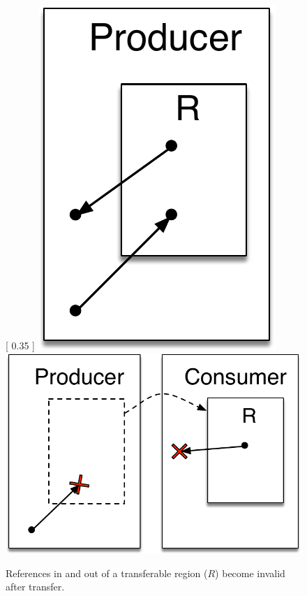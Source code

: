 \documentclass[a4paper,UKenglish]{lipics-v2018}
\begin{document}
\begin{figure}
\centering
{} [
  0.35\columnwidth
] {
  \includegraphics[scale=0.36]{producer-heap}
}
 {
  \includegraphics[scale=0.36]{producer-consumer-heap}
}

\caption{References in and out of a transferable region ($R$) become
invalid after transfer.}
\label{fig:transfer-violations}
\end{figure}
\end{document}
